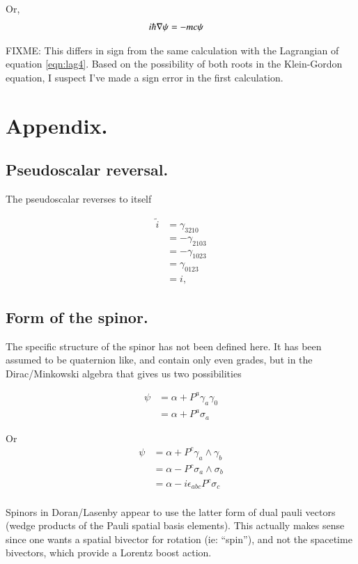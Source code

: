 \documentclass{article}
\begin{document}
Or,
\begin{align*}
i \hbar \nabla \psi &= -m c \psi 
\end{align*}

FIXME: This differs in sign from the same calculation with the Lagrangian of equation \ref{eqn:lag4}.  Based on 
the possibility of both roots in the Klein-Gordon equation, I suspect I've made a sign error in the first
calculation.

\section{ Appendix. }

\subsection{ Pseudoscalar reversal. }

The pseudoscalar reverses to itself

\begin{align*}
\tilde{i}
&= \gamma_{3210} \\
&= -\gamma_{2103} \\
&= -\gamma_{1023} \\
&= \gamma_{0123} \\
&= i,
\end{align*}

\subsection{ Form of the spinor. }

The specific structure of the spinor has not been defined here.  It has been assumed to be quaternion like,
and contain only even grades, but in the Dirac/Minkowski algebra that gives us two possibilities

\begin{align*}
\psi
&= \alpha + P^a \gamma_a \gamma_0 \\
&= \alpha + P^a \sigma_a
\end{align*}

Or
\begin{align*}
\psi 
&= \alpha + P^c \gamma_a \wedge \gamma_b \\
&= \alpha - P^c \sigma_a \wedge \sigma_b \\
&= \alpha - i \epsilon_{a b c} P^c \sigma_c \\
\end{align*}

Spinors in Doran/Lasenby appear to use the latter form of dual pauli vectors (wedge products of the Pauli spatial basis elements).  This actually makes sense since one wants a spatial bivector for rotation (ie: ``spin''), and not the spacetime bivectors, which provide a Lorentz boost action.




\end{document}
